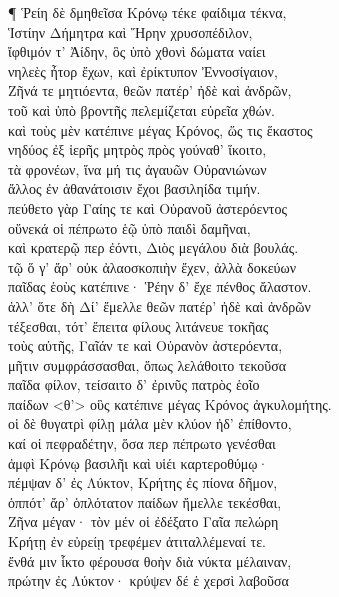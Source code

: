 ¶ Ῥείη δὲ δμηθεῖσα Κρόνῳ τέκε φαίδιμα τέκνα, \\
Ἱστίην Δήμητρα καὶ Ἥρην χρυσοπέδιλον, \\
ἴφθιμόν τ' Ἀίδην, ὃς ὑπὸ χθονὶ δώματα ναίει \\
νηλεὲς ἦτορ ἔχων, καὶ ἐρίκτυπον Ἐννοσίγαιον,\\
Ζῆνά τε μητιόεντα, θεῶν πατέρ' ἠδὲ καὶ ἀνδρῶν,\\
τοῦ καὶ ὑπὸ βροντῆς πελεμίζεται εὐρεῖα χθών.\\
καὶ τοὺς μὲν κατέπινε μέγας Κρόνος, ὥς τις ἕκαστος\\
νηδύος ἐξ ἱερῆς μητρὸς πρὸς γούναθ' ἵκοιτο, \\
τὰ φρονέων, ἵνα μή τις ἀγαυῶν Οὐρανιώνων\\
ἄλλος ἐν ἀθανάτοισιν ἔχοι βασιληίδα τιμήν.\\
πεύθετο γὰρ Γαίης τε καὶ Οὐρανοῦ ἀστερόεντος \\
οὕνεκά οἱ πέπρωτο ἑῷ ὑπὸ παιδὶ δαμῆναι, \\
καὶ κρατερῷ περ ἐόντι, Διὸς μεγάλου διὰ βουλάς.  \\
τῷ ὅ γ' ἄρ' οὐκ ἀλαοσκοπιὴν ἔχεν, ἀλλὰ δοκεύων \\
παῖδας ἑοὺς κατέπινε· Ῥέην δ' ἔχε πένθος ἄλαστον. \\
ἀλλ' ὅτε δὴ Δί' ἔμελλε θεῶν πατέρ' ἠδὲ καὶ ἀνδρῶν\\
τέξεσθαι, τότ' ἔπειτα φίλους λιτάνευε τοκῆας\\
τοὺς αὐτῆς, Γαῖάν τε καὶ Οὐρανὸν ἀστερόεντα, \\
μῆτιν συμφράσσασθαι, ὅπως λελάθοιτο τεκοῦσα\\
παῖδα φίλον, τείσαιτο δ' ἐρινῦς πατρὸς ἑοῖο \\
παίδων \textless{}θ'\textgreater{} οὓς κατέπινε μέγας Κρόνος ἀγκυλομήτης. \\
οἱ δὲ θυγατρὶ φίλῃ μάλα μὲν κλύον ἠδ' ἐπίθοντο, \\
καί οἱ πεφραδέτην, ὅσα περ πέπρωτο γενέσθαι \\
ἀμφὶ Κρόνῳ βασιλῆι καὶ υἱέι καρτεροθύμῳ· \\
πέμψαν δ' ἐς Λύκτον, Κρήτης ἐς πίονα δῆμον,\\
ὁππότ' ἄρ' ὁπλότατον παίδων ἤμελλε τεκέσθαι, \\
Ζῆνα μέγαν· τὸν μέν οἱ ἐδέξατο Γαῖα πελώρη \\
Κρήτῃ ἐν εὐρείῃ τρεφέμεν ἀτιταλλέμεναί τε.  \\
ἔνθά μιν ἷκτο φέρουσα θοὴν διὰ νύκτα μέλαιναν, \\
πρώτην ἐς Λύκτον· κρύψεν δέ ἑ χερσὶ λαβοῦσα \\
